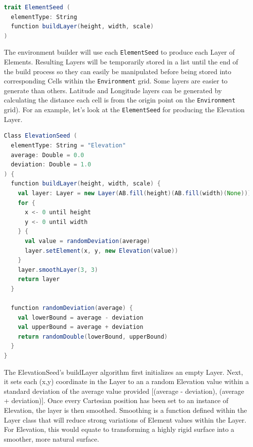 \begin{lstlisting}[language=Scala]
trait ElementSeed (
  elementType: String
  function buildLayer(height, width, scale)
)
\end{lstlisting}

The environment builder will use each \texttt{ElementSeed} to produce each Layer of Elements.
Resulting Layers will be temporarily stored in a list until the end of the build process so they can easily be manipulated before being stored into corresponding Cells within the \texttt{Environment} grid.
Some layers are easier to generate than others.
Latitude and Longitude layers can be generated by calculating the distance each cell is from the origin point on the \texttt{Environment} grid).
For an example, let’s look at the \texttt{ElementSeed} for producing the Elevation Layer.

\begin{lstlisting}[language=Scala]
Class ElevationSeed (
  elementType: String = "Elevation"
  average: Double = 0.0
  deviation: Double = 1.0
) {
  function buildLayer(height, width, scale) {
    val layer: Layer = new Layer(AB.fill(height)(AB.fill(width)(None)))
    for {
      x <- 0 until height
      y <- 0 until width
    } {
      val value = randomDeviation(average)
      layer.setElement(x, y, new Elevation(value))
    }
    layer.smoothLayer(3, 3)
    return layer
  }

  function randomDeviation(average) {
    val lowerBound = average - deviation
    val upperBound = average + deviation
    return randomDouble(lowerBound, upperBound)
  }
}
\end{lstlisting}


The ElevationSeed’s buildLayer algorithm first initializes an empty Layer.
Next, it sets each (x,y) coordinate in the Layer to an a random Elevation value within a standard deviation of the average value provided [(average - deviation), (average + deviation)].
Once every Cartesian position has been set to an instance of Elevation, the layer is then smoothed.
Smoothing is a function defined within the Layer class that will reduce strong variations of Element values within the Layer.
For Elevation, this would equate to transforming a highly rigid surface into a smoother, more natural surface.



